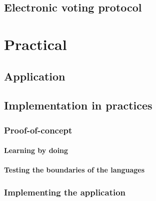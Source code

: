 \documentclass[a4paper]{report}
\theoremstyle{plain}
\begin{document}
\chapter{Electronic voting protocol}
    


\part{Practical}
\clearpage
\chapter{Application}
    
    
    
    
    
    
    
    
    
    
    
        
    
    
\clearpage
\chapter{Implementation in practices}

\section{Proof-of-concept}
    \subsection{Learning by doing}
    \subsection{Testing the boundaries of the languages}


\section{Implementing the application}
\end{document}
